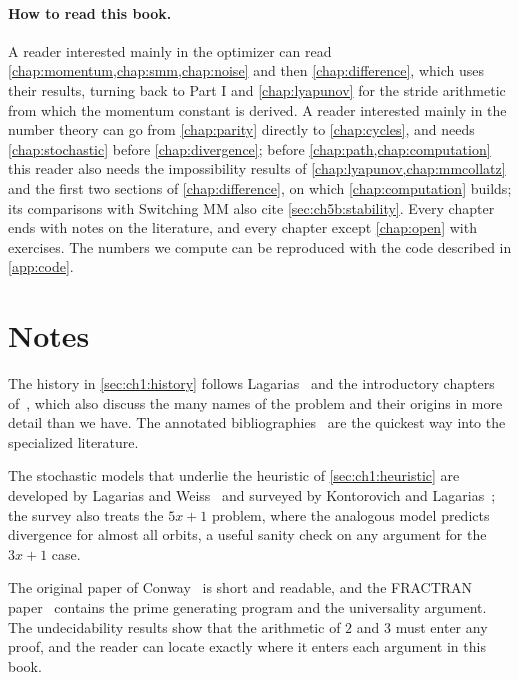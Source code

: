 \paragraph{How to read this book.} A reader interested mainly in the optimizer can read \cref{chap:momentum,chap:smm,chap:noise} and then \cref{chap:difference}, which uses their results, turning back to Part I and \cref{chap:lyapunov} for the stride arithmetic from which the momentum constant is derived. A reader interested mainly in the number theory can go from \cref{chap:parity} directly to \cref{chap:cycles}, and needs \cref{chap:stochastic} before \cref{chap:divergence}; before \cref{chap:path,chap:computation} this reader also needs the impossibility results of \cref{chap:lyapunov,chap:mmcollatz} and the first two sections of \cref{chap:difference}, on which \cref{chap:computation} builds; its comparisons with Switching MM also cite \cref{sec:ch5b:stability}. Every chapter ends with notes on the literature, and every chapter except \cref{chap:open} with exercises. The numbers we compute can be reproduced with the code described in \cref{app:code}.

\section*{Notes}

The history in \cref{sec:ch1:history} follows Lagarias~\cite{lagarias1985} and
the introductory chapters of~\cite{lagarias2010}, which also discuss the many
names of the problem and their origins in more detail than we have. The
annotated bibliographies~\cite{lagarias2003bib,lagarias2006bib} are the
quickest way into the specialized literature.

The stochastic models that underlie the heuristic of
\cref{sec:ch1:heuristic} are developed by Lagarias and Weiss~\cite{lagarias1992} and surveyed by Kontorovich and Lagarias~\cite{kontorovich2009}; the survey also treats
the $5x+1$ problem, where the analogous model predicts divergence for almost
all orbits, a useful sanity check on any argument for the $3x+1$ case.

The original paper of Conway~\cite{conway1972} is short and readable, and
the FRACTRAN paper~\cite{conway1987} contains the prime generating program and the
universality argument. The undecidability results show that the arithmetic of
$2$ and $3$ must enter any proof, and the reader can locate exactly where it enters each argument in this book.


